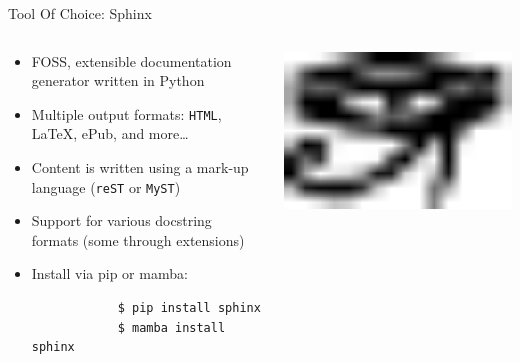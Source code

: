 \begin{frame}[fragile]{Tool Of Choice: Sphinx}
  \begin{columns}[t, onlytextwidth]
    \begin{column}{0.68\textwidth}
      \begin{itemize}
        \setlength{\itemsep}{1em}
        \item FOSS, extensible documentation generator written in Python
        \item Multiple output formats: \texttt{HTML}, \LaTeX, ePub, and more\dots
        \item Content is written using a mark-up language (\texttt{reST} or \texttt{MyST})
        \item Support for various docstring formats (some through extensions)
        \item Install via pip or mamba:
          \begin{verbatim}
            $ pip install sphinx
            $ mamba install sphinx
          \end{verbatim}
      \end{itemize}
    \end{column}
    \hfill
    \begin{column}{0.38\textwidth}
      \begin{center}
      \includegraphics[width=10cm]{logos/sphinx-logo.pdf}
      \end{center}
    \end{column}
  \end{columns}
\end{frame}
